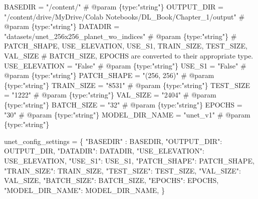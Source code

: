 \documentclass[
  letterpaper,
  DIV=11,
  numbers=noendperiod]{scrreprt}
\newenvironment{Shaded}{\begin{snugshade}}{\end{snugshade}}
\newcommand{\CommentTok}[1]{\textcolor[rgb]{0.37,0.37,0.37}{#1}}
\newcommand{\NormalTok}[1]{\textcolor[rgb]{0.00,0.23,0.31}{#1}}
\newcommand{\OperatorTok}[1]{\textcolor[rgb]{0.37,0.37,0.37}{#1}}
\newcommand{\StringTok}[1]{\textcolor[rgb]{0.13,0.47,0.30}{#1}}
\begin{document}
\begin{Shaded}
\begin{Highlighting}[]
\NormalTok{BASEDIR   }\OperatorTok{=} \StringTok{"/content/"} \CommentTok{\# @param \{type:"string"\}}
\NormalTok{OUTPUT\_DIR }\OperatorTok{=} \StringTok{"/content/drive/MyDrive/Colab Notebooks/DL\_Book/Chapter\_1/output"} \CommentTok{\# @param \{type:"string"\}}
\NormalTok{DATADIR }\OperatorTok{=} \StringTok{"datasets/unet\_256x256\_planet\_wo\_indices"} \CommentTok{\# @param \{type:"string"\}}
\CommentTok{\# PATCH\_SHAPE, USE\_ELEVATION, USE\_S1, TRAIN\_SIZE, TEST\_SIZE, VAL\_SIZE}
\CommentTok{\# BATCH\_SIZE, EPOCHS are converted to their appropriate type.}
\NormalTok{USE\_ELEVATION }\OperatorTok{=} \StringTok{"False"} \CommentTok{\# @param \{type:"string"\}}
\NormalTok{USE\_S1 }\OperatorTok{=} \StringTok{"False"} \CommentTok{\# @param \{type:"string"\}}
\NormalTok{PATCH\_SHAPE }\OperatorTok{=} \StringTok{"(256, 256)"} \CommentTok{\# @param \{type:"string"\}}
\NormalTok{TRAIN\_SIZE }\OperatorTok{=} \StringTok{"8531"} \CommentTok{\# @param \{type:"string"\}}
\NormalTok{TEST\_SIZE }\OperatorTok{=} \StringTok{"1222"} \CommentTok{\# @param \{type:"string"\}}
\NormalTok{VAL\_SIZE }\OperatorTok{=} \StringTok{"2404"} \CommentTok{\# @param \{type:"string"\}}
\NormalTok{BATCH\_SIZE }\OperatorTok{=} \StringTok{"32"} \CommentTok{\# @param \{type:"string"\}}
\NormalTok{EPOCHS }\OperatorTok{=} \StringTok{"30"} \CommentTok{\# @param \{type:"string"\}}
\NormalTok{MODEL\_DIR\_NAME }\OperatorTok{=} \StringTok{"unet\_v1"} \CommentTok{\# @param \{type:"string"\}}
\end{Highlighting}
\end{Shaded}

\begin{Shaded}
\begin{Highlighting}[]
\NormalTok{unet\_config\_settings }\OperatorTok{=}\NormalTok{ \{}
    \StringTok{"BASEDIR"}\NormalTok{ : BASEDIR,}
    \StringTok{"OUTPUT\_DIR"}\NormalTok{: OUTPUT\_DIR,}
    \StringTok{"DATADIR"}\NormalTok{: DATADIR,}
    \StringTok{"USE\_ELEVATION"}\NormalTok{: USE\_ELEVATION,}
    \StringTok{"USE\_S1"}\NormalTok{: USE\_S1,}
    \StringTok{"PATCH\_SHAPE"}\NormalTok{: PATCH\_SHAPE,}
    \StringTok{"TRAIN\_SIZE"}\NormalTok{: TRAIN\_SIZE,}
    \StringTok{"TEST\_SIZE"}\NormalTok{: TEST\_SIZE,}
    \StringTok{"VAL\_SIZE"}\NormalTok{: VAL\_SIZE,}
    \StringTok{"BATCH\_SIZE"}\NormalTok{: BATCH\_SIZE,}
    \StringTok{"EPOCHS"}\NormalTok{: EPOCHS,}
    \StringTok{"MODEL\_DIR\_NAME"}\NormalTok{: MODEL\_DIR\_NAME,}
\NormalTok{\}}
\end{Highlighting}
\end{Shaded}
\end{document}
